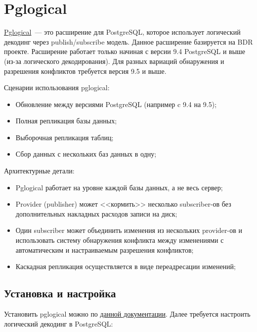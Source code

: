 \section{Pglogical}
\label{sec:pglogical}

\href{https://2ndquadrant.com/en/resources/pglogical/}{Pglogical}~--- это расширение для PostgreSQL, которое использует логический декодинг через publish/subscribe модель. Данное расширение базируется на BDR проекте. Расширение работает только начиная с версии 9.4 PostgreSQL и выше (из-за логического декодирования). Для разных вариаций обнаружения и разрешения конфликтов требуется версия 9.5 и выше.

Сценарии использования pglogical:

\begin{itemize}
  \item Обновление между версиями PostgreSQL (например c 9.4 на 9.5);
  \item Полная репликация базы данных;
  \item Выборочная репликация таблиц;
  \item Сбор данных с нескольких баз данных в одну;
\end{itemize}

Архитектурные детали:

\begin{itemize}
  \item Pglogical работает на уровне каждой базы данных, а не весь сервер;
  \item Provider (publisher) может <<кормить>> несколько subscriber-ов без дополнительных накладных расходов записи на диск;
  \item Один subscriber может объединить изменения из нескольких provider-ов и использовать систему обнаружения конфликта между изменениями с автоматическим и настраиваемым разрешения конфликтов;
  \item Каскадная репликация осуществляется в виде переадресации изменений;
\end{itemize}


\subsection{Установка и настройка}


Установить pglogical можно по \href{https://2ndquadrant.com/en/resources/pglogical/pglogical-installation-instructions/}{данной документации}. Далее требуется настроить логический декодинг в PostgreSQL:


